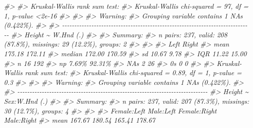 \documentclass[
]{book}
\newenvironment{Shaded}{\begin{snugshade}}{\end{snugshade}}
\newcommand{\CommentTok}[1]{\textcolor[rgb]{0.56,0.35,0.01}{\textit{#1}}}
\begin{document}
\begin{Shaded}
\begin{Highlighting}[]
\CommentTok{\#\textgreater{} }
\CommentTok{\#\textgreater{} Kruskal{-}Wallis rank sum test:}
\CommentTok{\#\textgreater{}   Kruskal{-}Wallis chi{-}squared = 97, df = 1, p{-}value \textless{}2e{-}16}
\CommentTok{\#\textgreater{} }
\CommentTok{\#\textgreater{} }
\CommentTok{\#\textgreater{} Warning:}
\CommentTok{\#\textgreater{}   Grouping variable contains 1 NAs (0.422\%).}
\CommentTok{\#\textgreater{} }
\CommentTok{\#\textgreater{} {-}{-}{-}{-}{-}{-}{-}{-}{-}{-}{-}{-}{-}{-}{-}{-}{-}{-}{-}{-}{-}{-}{-}{-}{-}{-}{-}{-}{-}{-}{-}{-}{-}{-}{-}{-}{-}{-}{-}{-}{-}{-}{-}{-}{-}{-}{-}{-}{-}{-}{-}{-}{-}{-}{-}{-}{-}{-}{-}{-}{-}{-}{-}{-}{-}{-}{-}{-}{-}{-}{-}{-}{-}{-}{-}{-}{-}{-} }
\CommentTok{\#\textgreater{} Height \textasciitilde{} W.Hnd (.)}
\CommentTok{\#\textgreater{} }
\CommentTok{\#\textgreater{} Summary: }
\CommentTok{\#\textgreater{} n pairs: 237, valid: 208 (87.8\%), missings: 29 (12.2\%), groups: 2}
\CommentTok{\#\textgreater{} }
\CommentTok{\#\textgreater{}                       }
\CommentTok{\#\textgreater{}           Left   Right}
\CommentTok{\#\textgreater{} mean    175.18  172.11}
\CommentTok{\#\textgreater{} median  172.00  170.59}
\CommentTok{\#\textgreater{} sd       10.67    9.78}
\CommentTok{\#\textgreater{} IQR      11.22   15.00}
\CommentTok{\#\textgreater{} n           16     192}
\CommentTok{\#\textgreater{} np       7.69\%  92.31\%}
\CommentTok{\#\textgreater{} NAs          2      26}
\CommentTok{\#\textgreater{} 0s           0       0}
\CommentTok{\#\textgreater{} }
\CommentTok{\#\textgreater{} Kruskal{-}Wallis rank sum test:}
\CommentTok{\#\textgreater{}   Kruskal{-}Wallis chi{-}squared = 0.89, df = 1, p{-}value = 0.3}
\CommentTok{\#\textgreater{} }
\CommentTok{\#\textgreater{} }
\CommentTok{\#\textgreater{} Warning:}
\CommentTok{\#\textgreater{}   Grouping variable contains 1 NAs (0.422\%).}
\CommentTok{\#\textgreater{} }
\CommentTok{\#\textgreater{} {-}{-}{-}{-}{-}{-}{-}{-}{-}{-}{-}{-}{-}{-}{-}{-}{-}{-}{-}{-}{-}{-}{-}{-}{-}{-}{-}{-}{-}{-}{-}{-}{-}{-}{-}{-}{-}{-}{-}{-}{-}{-}{-}{-}{-}{-}{-}{-}{-}{-}{-}{-}{-}{-}{-}{-}{-}{-}{-}{-}{-}{-}{-}{-}{-}{-}{-}{-}{-}{-}{-}{-}{-}{-}{-}{-}{-}{-} }
\CommentTok{\#\textgreater{} Height \textasciitilde{} Sex:W.Hnd (.)}
\CommentTok{\#\textgreater{} }
\CommentTok{\#\textgreater{} Summary: }
\CommentTok{\#\textgreater{} n pairs: 237, valid: 207 (87.3\%), missings: 30 (12.7\%), groups: 4}
\CommentTok{\#\textgreater{} }
\CommentTok{\#\textgreater{}                                                               }
\CommentTok{\#\textgreater{}          Female:Left     Male:Left  Female:Right    Male:Right}
\CommentTok{\#\textgreater{} mean          167.67        180.54        165.41        178.67}

\end{Highlighting}
\end{Shaded}
\end{document}

